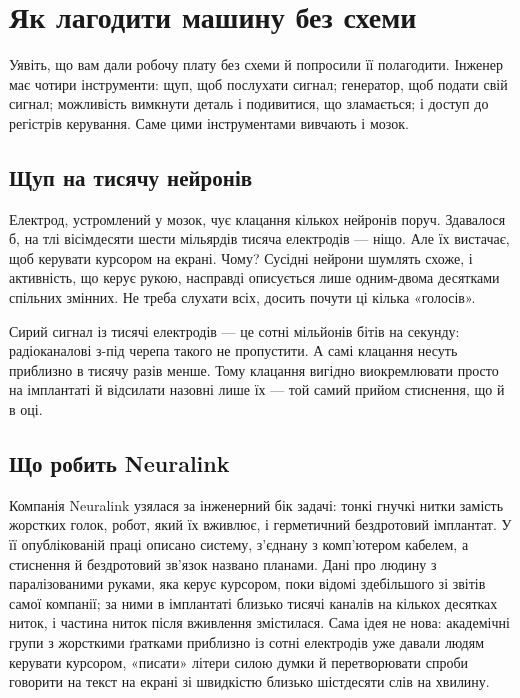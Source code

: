 \chapter{Як лагодити машину без схеми}


Уявіть, що вам дали робочу плату без схеми й попросили її полагодити. Інженер має чотири інструменти: щуп, щоб послухати сигнал; генератор, щоб подати свій сигнал; можливість вимкнути деталь і подивитися, що зламається; і доступ до регістрів керування. Саме цими інструментами вивчають і мозок.

\section*{Щуп на тисячу нейронів}

Електрод, устромлений у мозок, чує клацання кількох нейронів поруч. Здавалося б, на тлі вісімдесяти шести мільярдів тисяча електродів --- ніщо. Але їх вистачає, щоб керувати курсором на екрані. Чому? Сусідні нейрони шумлять схоже, і активність, що керує рукою, насправді описується лише одним-двома десятками спільних змінних. Не треба слухати всіх, досить почути ці кілька «голосів».

Сирий сигнал із тисячі електродів --- це сотні мільйонів бітів на секунду: радіоканалові з-під черепа такого не пропустити. А самі клацання несуть приблизно в тисячу разів менше. Тому клацання вигідно виокремлювати просто на імплантаті й відсилати назовні лише їх --- той самий прийом стиснення, що й в оці.

\section*{Що робить Neuralink}

Компанія Neuralink узялася за інженерний бік задачі: тонкі гнучкі нитки замість жорстких голок, робот, який їх вживлює, і герметичний бездротовий імплантат. У її опублікованій праці описано систему, з'єднану з комп'ютером кабелем, а стиснення й бездротовий зв'язок названо планами. Дані про людину з паралізованими руками, яка керує курсором, поки відомі здебільшого зі звітів самої компанії; за ними в імплантаті близько тисячі каналів на кількох десятках ниток, і частина ниток після вживлення змістилася. Сама ідея не нова: академічні групи з жорсткими ґратками приблизно із сотні електродів уже давали людям керувати курсором, «писати» літери силою думки й перетворювати спроби говорити на текст на екрані зі швидкістю близько шістдесяти слів на хвилину.

